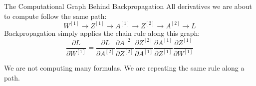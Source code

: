 \documentclass[11pt,aspectratio=169,professionalfonts]{beamer}
\begin{document}
%
%
\begin{frame}{The Computational Graph Behind Backpropagation}
All derivatives we are about to compute follow the same path:
\[
W^{[1]} \rightarrow Z^{[1]} \rightarrow A^{[1]} \rightarrow Z^{[2]} \rightarrow A^{[2]} \rightarrow L
\]
Backpropagation simply applies the chain rule along this graph:
\[
\frac{\partial L}{\partial W^{[1]}}
=
\frac{\partial L}{\partial A^{[2]}}
\frac{\partial A^{[2]}}{\partial Z^{[2]}}
\frac{\partial Z^{[2]}}{\partial A^{[1]}}
\frac{\partial A^{[1]}}{\partial Z^{[1]}}
\frac{\partial Z^{[1]}}{\partial W^{[1]}}
\]

We are not computing many formulas. We are repeating the same rule along a path.
\end{frame}
%
%
\end{document}
